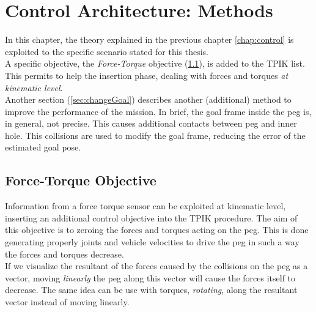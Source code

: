 

\chapter[Control Architecture: Methods]{Control Architecture: Methods}
\label{chap:method}
\ifpdf
    \graphicspath{{Method/Figures/PNG/}{Method/Figures/PDF/}{Method/Figures/}}
\else
    \graphicspath{{Method/Figures/EPS/}{Method/Figures/}}
\fi

In this chapter, the theory explained in the previous chapter \ref{chap:control} is exploited to the specific scenario stated for this thesis.\\
A specific objective, the \textit{Force-Torque} objective (\ref{sec:forceTask}), is added to the TPIK list. This permits to help the insertion phase, dealing with forces and torques \textit{at kinematic level}.\\
Another section (\ref{sec:changeGoal}) describes another (additional) method to improve the performance of the mission. In brief, the goal frame inside the peg is, in general, not precise. This causes additional contacts between peg and inner hole. This collisions are used to modify the goal frame, reducing the error of the estimated goal pose.


\section{Force-Torque Objective}
\label{sec:forceTask}
Information from a force torque sensor can be exploited at kinematic level, inserting an additional control objective into the TPIK procedure. The aim of this objective is to zeroing the forces and torques acting on the peg. This is done generating properly joints and vehicle velocities to drive the peg in such a way the forces and torques decrease.\\
If we visualize the resultant of the forces caused by the collisions on the peg as a vector, moving \textit{linearly} the peg along this vector will cause the forces itself to decrease. The same idea can be use with torques, \textit{rotating}, along the resultant vector instead of moving linearly.\\

